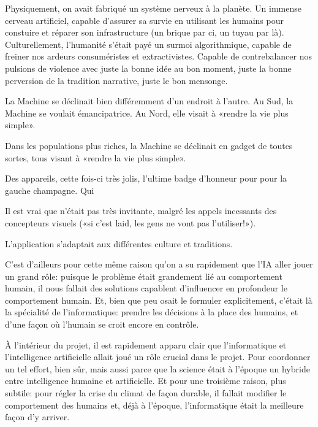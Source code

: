     Physiquement, on avait fabriqué un système nerveux à la planète. Un immense
    cerveau artificiel, capable d'assurer sa survie en utilisant les humains
    pour constuire et réparer son infrastructure (un brique par ci, un tuyau
    par là).  Culturellement, l'humanité s'était payé un surmoi algorithmique,
    capable de freiner nos ardeurs consuméristes et extractivistes. Capable de
    contrebalancer nos pulsions de violence avec juste la bonne idée au bon
    moment, juste la bonne perversion de la tradition narrative, juste le bon
    mensonge.

    La Machine se déclinait bien différemment d'un endroit à l'autre.  Au Sud,
    la Machine se voulait émancipatrice. Au Nord, elle visait à «rendre la vie
    plus simple».

    Dans les populations plus riches, la Machine se déclinait en gadget de
    toutes sortes, tous visant à «rendre la vie plus simple».


    Des appareils, cette fois-ci très jolis, l'ultime badge d'honneur pour pour
    la gauche champagne. Qui 


    Il est vrai que \nomProjet{} n'était pas très invitante, malgré les appels
    incessants des concepteurs visuels («si c'est laid, les gens ne vont pas
    l'utiliser!»).

    L'application s'adaptait aux différentes culture et traditions.
    


    C'est d'ailleurs pour cette même
    raison qu'on a su rapidement que l'IA aller jouer un grand rôle: puisque le
    problème était grandement lié au comportement humain, il nous fallait des
    solutions capablent d'influencer en profondeur le comportement humain. Et,
    bien que peu osait le formuler explicitement, c'était là la spécialité de
    l'informatique: prendre les décisions à la place des humains, et d'une
    façon où l'humain se croit encore en contrôle.



À l'intérieur du projet, il est rapidement apparu clair que l'informatique et
    l'intelligence artificielle allait joué un rôle crucial dans le projet.
    Pour coordonner un tel effort, bien sûr, mais aussi parce que la science
    était à l'époque un hybride entre intelligence humaine et artificielle.  Et
    pour une troisième raison, plus subtile: pour régler la crise du climat de
    façon durable, il fallait modifier le comportement des humains et, déjà à
    l'époque, l'informatique était la meilleure façon d'y arriver. 


